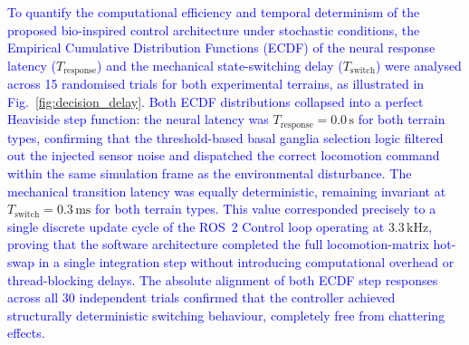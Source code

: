 \documentclass[preprint,12pt]{elsarticle}
\newcommand{\revblue}[1]{\textcolor{blue}{#1}}
\begin{document}
\revblue{To quantify the computational efficiency and temporal determinism of the proposed bio-inspired control architecture under stochastic conditions, the Empirical Cumulative Distribution Functions (ECDF) of the neural response latency (}$T_{\text{response}}$\revblue{) and the mechanical state-switching delay (}$T_{\text{switch}}$\revblue{) were analysed across 15 randomised trials for both experimental terrains, as illustrated in Fig.}~\ref{fig:decision_delay}\revblue{. Both ECDF distributions collapsed into a perfect Heaviside step function: the neural latency was} $T_{\text{response}} = 0.0\,\text{s}$ \revblue{for both terrain types, confirming that the threshold-based basal ganglia selection logic filtered out the injected sensor noise and dispatched the correct locomotion command within the same simulation frame as the environmental disturbance. The mechanical transition latency was equally deterministic, remaining invariant at} $T_{\text{switch}} = 0.3\,\text{ms}$ \revblue{for both terrain types. This value corresponded precisely to a single discrete update cycle of the ROS~2 Control loop operating at} $3.3\,\text{kHz}$\revblue{, proving that the software architecture completed the full locomotion-matrix hot-swap in a single integration step without introducing computational overhead or thread-blocking delays. The absolute alignment of both ECDF step responses across all 30 independent trials confirmed that the controller achieved structurally deterministic switching behaviour, completely free from chattering effects.}
\end{document}
